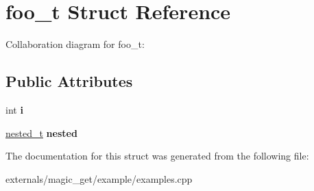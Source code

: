\hypertarget{structfoo__t}{}\section{foo\+\_\+t Struct Reference}
\label{structfoo__t}


Collaboration diagram for foo\+\_\+t\+:
\subsection*{Public Attributes}
\begin{DoxyCompactItemize}
\item 
\mbox{\label{structfoo__t_a2efded1ba3e7fd437686401a883d03c4}} 
int {\bfseries i}
\item 
\mbox{\label{structfoo__t_af05399190d47acf5b84826804b40189a}} 
\mbox{\hyperlink{structnested__t}{nested\+\_\+t}} {\bfseries nested}
\end{DoxyCompactItemize}


The documentation for this struct was generated from the following file\+:\begin{DoxyCompactItemize}
\item 
externals/magic\+\_\+get/example/examples.\+cpp\end{DoxyCompactItemize}
